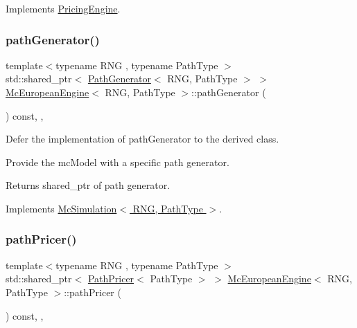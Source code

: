 Implements \hyperlink{class_pricing_engine_a733511ffc3cf5e4dc1fbc2a39208d8bd}{Pricing\+Engine}.

\hypertarget{class_mc_european_engine_ac0f14a7ff770c69ce802eb662230e4cb}{}\label{class_mc_european_engine_ac0f14a7ff770c69ce802eb662230e4cb} 
\subsubsection{\texorpdfstring{path\+Generator()}{pathGenerator()}}
{\footnotesize\ttfamily template$<$typename R\+NG , typename Path\+Type $>$ \\
std\+::shared\+\_\+ptr$<$ \hyperlink{class_path_generator}{Path\+Generator}$<$ R\+NG, Path\+Type $>$ $>$ \hyperlink{class_mc_european_engine}{Mc\+European\+Engine}$<$ R\+NG, Path\+Type $>$\+::path\+Generator (\begin{DoxyParamCaption}{ }\end{DoxyParamCaption}) const\hspace{0.3cm}{\ttfamily [override]}, {\ttfamily [private]}, {\ttfamily [virtual]}}



Defer the implementation of path\+Generator to the derived class. 

Provide the mc\+Model with a specific path generator. \begin{DoxyReturn}{Returns}
shared\+\_\+ptr of path generator. 
\end{DoxyReturn}


Implements \hyperlink{class_mc_simulation_afa7ba8d9b534837e7c62f47c6d20a353}{Mc\+Simulation$<$ R\+N\+G, Path\+Type $>$}.

\hypertarget{class_mc_european_engine_ad4fb94329470643f2edc491bfcb31bdf}{}\label{class_mc_european_engine_ad4fb94329470643f2edc491bfcb31bdf} 
\subsubsection{\texorpdfstring{path\+Pricer()}{pathPricer()}}
{\footnotesize\ttfamily template$<$typename R\+NG , typename Path\+Type $>$ \\
std\+::shared\+\_\+ptr$<$ \hyperlink{class_path_pricer}{Path\+Pricer}$<$ Path\+Type $>$ $>$ \hyperlink{class_mc_european_engine}{Mc\+European\+Engine}$<$ R\+NG, Path\+Type $>$\+::path\+Pricer (\begin{DoxyParamCaption}{ }\end{DoxyParamCaption}) const\hspace{0.3cm}{\ttfamily [override]}, {\ttfamily [private]}, {\ttfamily [virtual]}}



